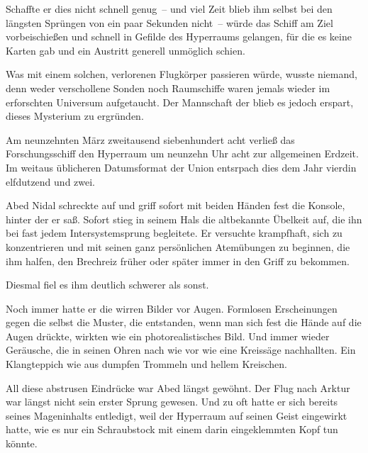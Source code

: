 \par

Schaffte er dies nicht schnell genug~-- und viel Zeit blieb ihm selbst bei den längsten Sprüngen von ein paar Sekunden nicht~-- würde das Schiff am Ziel vorbeischießen und schnell in Gefilde des Hyperraums gelangen, für die es keine Karten gab und ein Austritt generell unmöglich schien.

\par

Was mit einem solchen, verlorenen Flugkörper passieren würde, wusste niemand, denn weder verschollene Sonden noch Raumschiffe waren jemals wieder im erforschten Universum aufgetaucht. Der Mannschaft der  blieb es jedoch erspart, dieses Mysterium zu ergründen.

\par

Am neunzehnten März zweitausend siebenhundert acht verließ das Forschungsschiff den Hyperraum um neunzehn Uhr acht zur allgemeinen Erdzeit. Im weitaus üblicheren Datumsformat der Union entsrpach dies dem Jahr vierdin elfdutzend und zwei.

\par

Abed Nidal schreckte auf und griff sofort mit beiden Händen fest die Konsole, hinter der er saß. Sofort stieg in seinem Hals die altbekannte Übelkeit auf, die ihn bei fast jedem Intersystemsprung begleitete. Er versuchte krampfhaft, sich zu konzentrieren und mit seinen ganz persönlichen Atemübungen zu beginnen, die ihm halfen, den Brechreiz früher oder später immer in den Griff zu bekommen.

\par

Diesmal fiel es ihm deutlich schwerer als sonst.

\par

Noch immer hatte er die wirren Bilder vor Augen. Formlosen Erscheinungen gegen die selbst die Muster, die entstanden, wenn man sich fest die Hände auf die Augen drückte, wirkten wie ein photorealistisches Bild. Und immer wieder Geräusche, die in seinen Ohren nach wie vor wie eine Kreissäge nachhallten. Ein Klangteppich wie aus dumpfen Trommeln und hellem Kreischen.

\par

All diese abstrusen Eindrücke war Abed längst gewöhnt. Der Flug nach Arktur war längst nicht sein erster Sprung gewesen. Und zu oft hatte er sich bereits seines Mageninhalts entledigt, weil der Hyperraum auf seinen Geist eingewirkt hatte, wie es nur ein Schraubstock mit einem darin eingeklemmten Kopf tun könnte.

